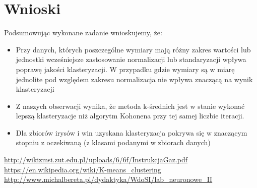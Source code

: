\documentclass{classrep}
\begin{document}
    \section{Wnioski}
    {
        Podsumowując wykonane zadanie wnioskujemy, że:
        \begin{itemize}
            \item Przy danych, których poszczególne wymiary mają różny zakres wartości lub jednostki wcześniejsze zastosowanie
            normalizacji lub standaryzacji wpływa poprawę jakości klasteryzacji. W przypadku gdzie wymiary są w miarę jednolite
            pod względem zakresu normalizacja nie wpływa znaczącą na wynik klasteryzacji
            \item Z naszych obserwacji wynika, że metoda k-średnich jest w stanie wykonać lepszą klasteryzacje niż algorytm
            Kohonena przy tej samej liczbie iteracji.
            \item Dla zbiorów irysów i win uzyskana klasteryzacja pokrywa się w znaczącym stopniu z oczekiwaną
            (z klasami podanymi w zbiorach danych)
        \end{itemize}
    }
    \begin{thebibliography}{0}
        \url{ http://wikizmsi.zut.edu.pl/uploads/6/6f/InstrukcjaGaz.pdf}
         \url{https://en.wikipedia.org/wiki/K-means\_clustering}
         \url{http://www.michalbereta.pl/dydaktyka/WdoSI/lab_neuronowe_II}
    \end{thebibliography}
\end{document}
